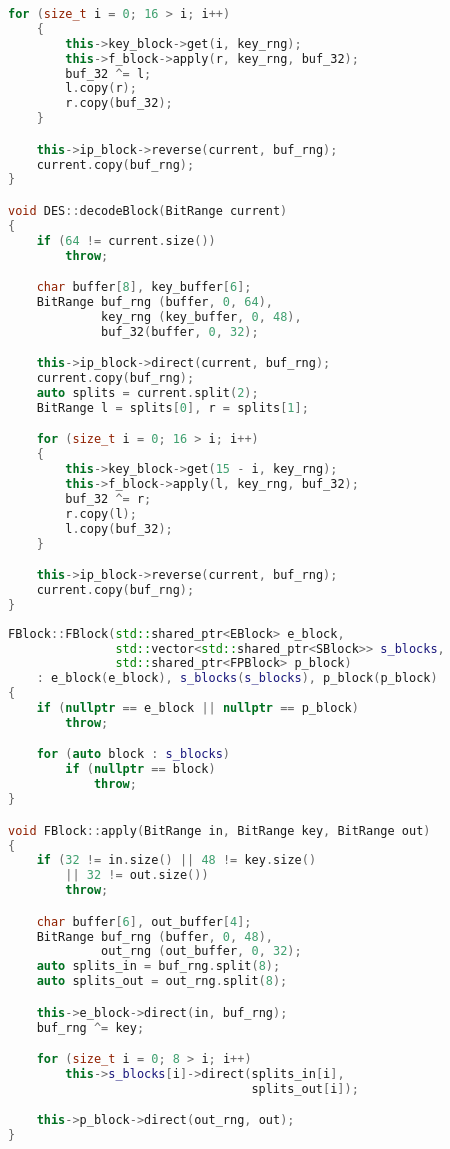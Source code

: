 \begin{lstlisting}[language=c++, caption={Класс, реализующий алгоритм DES}]
    for (size_t i = 0; 16 > i; i++)
    {
        this->key_block->get(i, key_rng);
        this->f_block->apply(r, key_rng, buf_32);
        buf_32 ^= l;
        l.copy(r);
        r.copy(buf_32);
    }

    this->ip_block->reverse(current, buf_rng);
    current.copy(buf_rng);
}

void DES::decodeBlock(BitRange current)
{
    if (64 != current.size())
        throw;

    char buffer[8], key_buffer[6];
    BitRange buf_rng (buffer, 0, 64),
             key_rng (key_buffer, 0, 48),
             buf_32(buffer, 0, 32);

    this->ip_block->direct(current, buf_rng);
    current.copy(buf_rng);
    auto splits = current.split(2);
    BitRange l = splits[0], r = splits[1];

    for (size_t i = 0; 16 > i; i++)
    {
        this->key_block->get(15 - i, key_rng);
        this->f_block->apply(l, key_rng, buf_32);
        buf_32 ^= r;
        r.copy(l);
        l.copy(buf_32);
    }

    this->ip_block->reverse(current, buf_rng);
    current.copy(buf_rng);
}
\end{lstlisting}
\clearpage
\begin{lstlisting}[language=c++, caption={Класс, реализующий функцию Фейстеля}]
FBlock::FBlock(std::shared_ptr<EBlock> e_block,
               std::vector<std::shared_ptr<SBlock>> s_blocks,
               std::shared_ptr<FPBlock> p_block)
    : e_block(e_block), s_blocks(s_blocks), p_block(p_block)
{
    if (nullptr == e_block || nullptr == p_block)
        throw;

    for (auto block : s_blocks)
        if (nullptr == block)
            throw;
}

void FBlock::apply(BitRange in, BitRange key, BitRange out)
{
    if (32 != in.size() || 48 != key.size()
        || 32 != out.size())
        throw;

    char buffer[6], out_buffer[4];
    BitRange buf_rng (buffer, 0, 48),
             out_rng (out_buffer, 0, 32);
    auto splits_in = buf_rng.split(8);
    auto splits_out = out_rng.split(8);

    this->e_block->direct(in, buf_rng);
    buf_rng ^= key;

    for (size_t i = 0; 8 > i; i++)
        this->s_blocks[i]->direct(splits_in[i],
                                  splits_out[i]);

    this->p_block->direct(out_rng, out);
}
\end{lstlisting}

